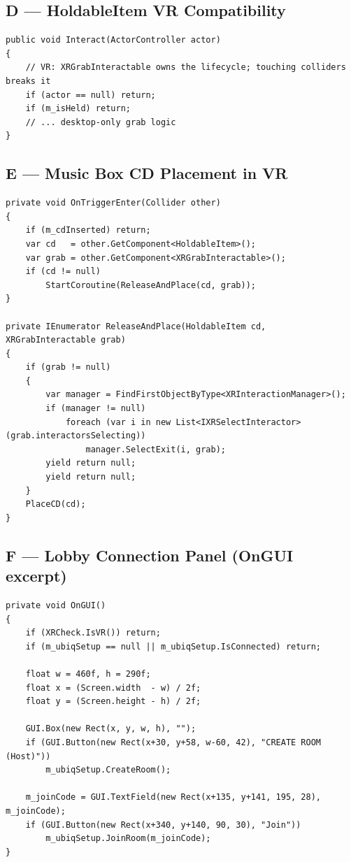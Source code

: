 \documentclass[12pt,a4paper]{article}
\begin{document}
\subsection*{D — HoldableItem VR Compatibility}

\begin{lstlisting}[caption={HoldableItem.cs — early return prevents collider conflict with XRGrabInteractable.}]
public void Interact(ActorController actor)
{
    // VR: XRGrabInteractable owns the lifecycle; touching colliders breaks it
    if (actor == null) return;
    if (m_isHeld) return;
    // ... desktop-only grab logic
}
\end{lstlisting}

\subsection*{E — Music Box CD Placement in VR}

\begin{lstlisting}[caption={MusicBoxController.cs — force-release grab before placing the CD.}]
private void OnTriggerEnter(Collider other)
{
    if (m_cdInserted) return;
    var cd   = other.GetComponent<HoldableItem>();
    var grab = other.GetComponent<XRGrabInteractable>();
    if (cd != null)
        StartCoroutine(ReleaseAndPlace(cd, grab));
}

private IEnumerator ReleaseAndPlace(HoldableItem cd, XRGrabInteractable grab)
{
    if (grab != null)
    {
        var manager = FindFirstObjectByType<XRInteractionManager>();
        if (manager != null)
            foreach (var i in new List<IXRSelectInteractor>(grab.interactorsSelecting))
                manager.SelectExit(i, grab);
        yield return null;
        yield return null;
    }
    PlaceCD(cd);
}
\end{lstlisting}

\subsection*{F — Lobby Connection Panel (OnGUI excerpt)}

\begin{lstlisting}[caption={LobbyConnectionPanel.cs — desktop OnGUI overlay (shown until Ubiq connected).}]
private void OnGUI()
{
    if (XRCheck.IsVR()) return;
    if (m_ubiqSetup == null || m_ubiqSetup.IsConnected) return;

    float w = 460f, h = 290f;
    float x = (Screen.width  - w) / 2f;
    float y = (Screen.height - h) / 2f;

    GUI.Box(new Rect(x, y, w, h), "");
    if (GUI.Button(new Rect(x+30, y+58, w-60, 42), "CREATE ROOM (Host)"))
        m_ubiqSetup.CreateRoom();

    m_joinCode = GUI.TextField(new Rect(x+135, y+141, 195, 28), m_joinCode);
    if (GUI.Button(new Rect(x+340, y+140, 90, 30), "Join"))
        m_ubiqSetup.JoinRoom(m_joinCode);
}
\end{lstlisting}
\end{document}

